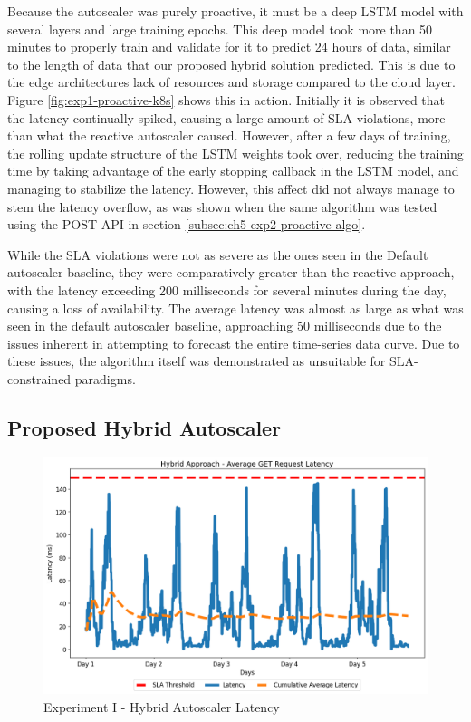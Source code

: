 Because the autoscaler was purely proactive, it must be a deep LSTM model with several layers and large training epochs. This deep model took more than 50 minutes to properly train and validate for it to predict 24 hours of data, similar to the length of data that our proposed hybrid solution predicted. This is due to the edge architectures lack of resources and storage compared to the cloud layer. Figure \ref{fig:exp1-proactive-k8s} shows this in action. Initially it is observed that the latency continually spiked, causing a large amount of SLA violations, more than what the reactive autoscaler caused. However, after a few days of training, the rolling update structure of the LSTM weights took over, reducing the training time by taking advantage of the early stopping callback in the LSTM model, and managing to stabilize the latency. However, this affect did not always manage to stem the latency overflow, as was shown when the same algorithm was tested using the POST API in section \ref{subsec:ch5-exp2-proactive-algo}.

While the SLA violations were not as severe as the ones seen in the Default autoscaler baseline, they were comparatively greater than the reactive approach, with the latency exceeding 200 milliseconds for several minutes during the day, causing a loss of availability. The average latency was almost as large as what was seen in the default autoscaler baseline, approaching 50 milliseconds due to the issues inherent in attempting to forecast the entire time-series data curve.  Due to these issues, the algorithm itself was demonstrated as unsuitable for SLA-constrained paradigms.\par

\subsection {Proposed Hybrid Autoscaler}
\label{subsec:ch5-exp1-hybrid-algo}

\begin{figure}[htb]
    \centering
    \caption{Experiment I - Hybrid Autoscaler Latency}
    \label{fig:exp1-hybrid-k8s}
    \includegraphics[width=0.6\linewidth]{Figures/Home-Timeline-Hybrid-Latency.png}
\end{figure}

